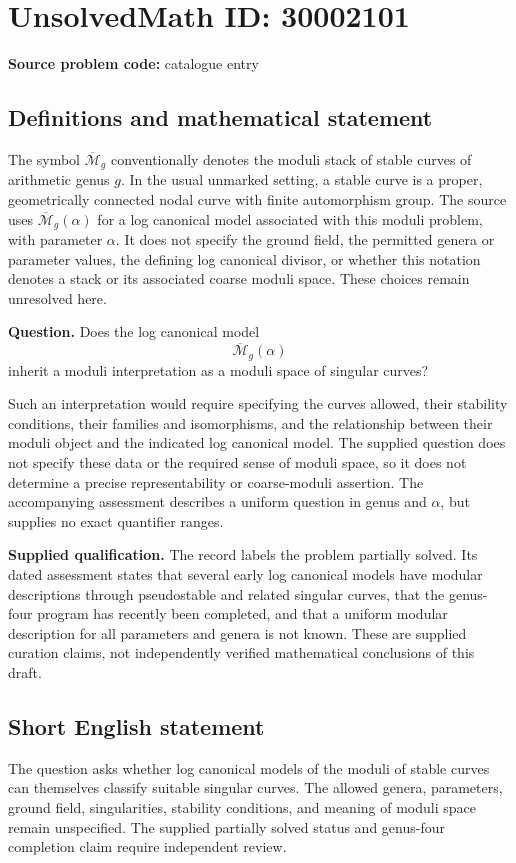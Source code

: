 \documentclass[11pt]{article}
\begin{document}
\section*{UnsolvedMath ID: 30002101}
\textbf{Source problem code:} catalogue entry
\subsection{Definitions and mathematical statement}
The symbol \(\overline{\mathcal M}_g\) conventionally denotes the moduli stack of stable curves of arithmetic genus \(g\). In the usual unmarked setting, a stable curve is a proper, geometrically connected nodal curve with finite automorphism group. The source uses \(\overline{\mathcal M}_g(\alpha)\) for a log canonical model associated with this moduli problem, with parameter \(\alpha\). It does not specify the ground field, the permitted genera or parameter values, the defining log canonical divisor, or whether this notation denotes a stack or its associated coarse moduli space. These choices remain unresolved here.

\textbf{Question.} Does the log canonical model
\[
\overline{\mathcal M}_g(\alpha)
\]
inherit a moduli interpretation as a moduli space of singular curves?

Such an interpretation would require specifying the curves allowed, their stability conditions, their families and isomorphisms, and the relationship between their moduli object and the indicated log canonical model. The supplied question does not specify these data or the required sense of moduli space, so it does not determine a precise representability or coarse-moduli assertion. The accompanying assessment describes a uniform question in genus and \(\alpha\), but supplies no exact quantifier ranges.

\textbf{Supplied qualification.} The record labels the problem partially solved. Its dated assessment states that several early log canonical models have modular descriptions through pseudostable and related singular curves, that the genus-four program has recently been completed, and that a uniform modular description for all parameters and genera is not known. These are supplied curation claims, not independently verified mathematical conclusions of this draft.
\subsection{Short English statement}
The question asks whether log canonical models of the moduli of stable curves can themselves classify suitable singular curves. The allowed genera, parameters, ground field, singularities, stability conditions, and meaning of moduli space remain unspecified. The supplied partially solved status and genus-four completion claim require independent review.
\end{document}
